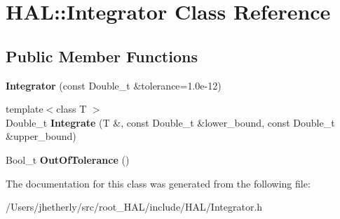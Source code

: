 \hypertarget{class_h_a_l_1_1_integrator}{\section{H\+A\+L\+:\+:Integrator Class Reference}
\label{class_h_a_l_1_1_integrator}
}
\subsection*{Public Member Functions}
\begin{DoxyCompactItemize}
\item 
\hypertarget{class_h_a_l_1_1_integrator_acd878eaa888dfce44a3c1130770a74a5}{{\bfseries Integrator} (const Double\+\_\+t \&tolerance=1.\+0e-\/12)}\label{class_h_a_l_1_1_integrator_acd878eaa888dfce44a3c1130770a74a5}

\item 
\hypertarget{class_h_a_l_1_1_integrator_a5eefbd36726dbcaaabb07cd617799661}{{\footnotesize template$<$class T $>$ }\\Double\+\_\+t {\bfseries Integrate} (T \&, const Double\+\_\+t \&lower\+\_\+bound, const Double\+\_\+t \&upper\+\_\+bound)}\label{class_h_a_l_1_1_integrator_a5eefbd36726dbcaaabb07cd617799661}

\item 
\hypertarget{class_h_a_l_1_1_integrator_ab866da7ce3499bcf3d874fac6ef1e6fc}{Bool\+\_\+t {\bfseries Out\+Of\+Tolerance} ()}\label{class_h_a_l_1_1_integrator_ab866da7ce3499bcf3d874fac6ef1e6fc}

\end{DoxyCompactItemize}


The documentation for this class was generated from the following file\+:\begin{DoxyCompactItemize}
\item 
/\+Users/jhetherly/src/root\+\_\+\+H\+A\+L/include/\+H\+A\+L/Integrator.\+h\end{DoxyCompactItemize}
